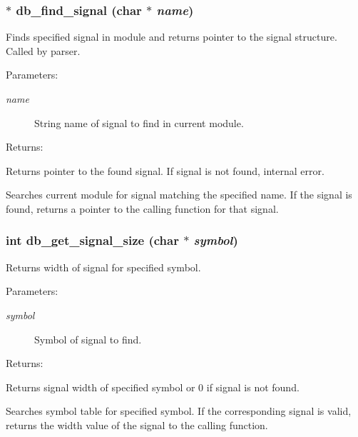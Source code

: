 \subsubsection{$\ast$ db\_\-find\_\-signal (char $\ast$ {\em name})}\label{db_8c_a19}


Finds specified signal in module and returns pointer to the signal structure. Called by parser.

\begin{Desc}
\item[Parameters: ]\par
\begin{description}
\item[{\em 
name}]String name of signal to find in current module.\end{description}
\end{Desc}
\begin{Desc}
\item[Returns: ]\par
Returns pointer to the found signal. If signal is not found, internal error.\end{Desc}
Searches current module for signal matching the specified name. If the signal is found, returns a pointer to the calling function for that signal. 
\subsubsection{\setlength{\rightskip}{0pt plus 5cm}int db\_\-get\_\-signal\_\-size (char $\ast$ {\em symbol})}\label{db_8c_a33}


Returns width of signal for specified symbol.

\begin{Desc}
\item[Parameters: ]\par
\begin{description}
\item[{\em 
symbol}]Symbol of signal to find.\end{description}
\end{Desc}
\begin{Desc}
\item[Returns: ]\par
Returns signal width of specified symbol or 0 if signal is not found.\end{Desc}
Searches symbol table for specified symbol. If the corresponding signal is valid, returns the width value of the signal to the calling function. 
